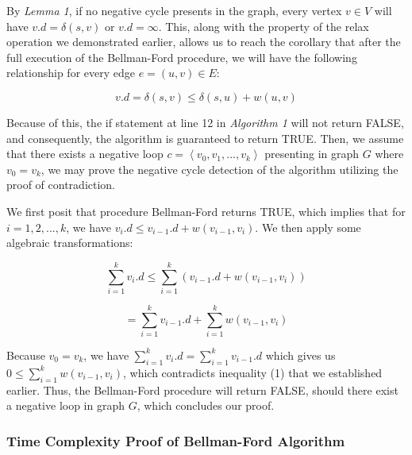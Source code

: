 \documentclass[12pt]{article}
\begin{document}
By \textit{Lemma 1}, if no negative cycle presents in the graph, every vertex $v \in V$ will have $v.d = \delta(s, v)$ or $v.d = \infty$. This, along with the property of the relax operation we demonstrated earlier, allows us to reach the corollary that after the full execution of the Bellman-Ford procedure, we will have the following relationship for every edge $e = (u, v) \in E$:

\begin{equation}
    v.d = \delta(s, v) \le \delta(s, u) + w(u, v)
\end{equation}

Because of this, the if statement at line 12 in \textit{Algorithm 1} will not return FALSE, and consequently, the algorithm is guaranteed to return TRUE. Then, we assume that there exists a negative loop $c = \left\langle v_0, v_1,...,v_k\right\rangle$ presenting in graph $G$ where $v_0 = v_k$, we may prove the negative cycle detection of the algorithm utilizing the proof of contradiction. 

\hspace*{\fill} %

We first posit that procedure Bellman-Ford returns TRUE, which implies that for $i = 1, 2,...,k$, we have $v_i.d \le v_{i-1}.d + w(v_{i-1}, v_i)$. We then apply some algebraic transformations:

$$
\sum^k_{i=1} v_i.d \le \sum^{k}_{i=1} (v_{i-1}.d + w(v_{i-1}, v_i)) 
$$

$$
= \sum^{k}_{i=1} v_{i-1}.d + \sum^{k}_{i=1} w(v_{i-1}, v_i)
$$

\hspace*{\fill} %

Because $v_0 = v_k$, we have $\sum^{k}_{i=1} v_i.d = \sum^{k}_{i=1} v_{i-1}.d$ which gives us $0 \le \sum^{k}_{i=1} w(v_{i-1}, v_i)$, which contradicts inequality (1) that we established earlier. Thus, the Bellman-Ford procedure will return FALSE, should there exist a negative loop in graph $G$, which concludes our proof.

\subsubsection{Time Complexity Proof of Bellman-Ford Algorithm}
\end{document}
